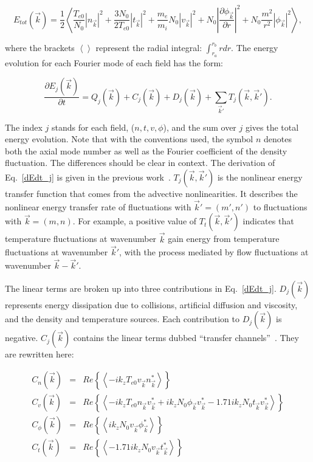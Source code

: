 \documentclass[showpacs,preprintnumbers,amsmath,amssymb,superscriptaddress,aip]{revtex4-1}
\def\beq{\begin{equation}}
\def\eeq{\end{equation}}
\def\beqar{\begin{eqnarray}}
\def\eeqar{\end{eqnarray}}
\newcommand{\pdiff}[2]{\frac{\partial#1}{\partial#2}}
\begin{document}
\beq
\label{E_k}
E_{tot}(\vec{k}) = \frac{1}{2} \left< \frac{T_{e0}}{N_0} |n_{\vec{k}}|^2 + \frac{3 N_0}{2 T_{e0}} |t_{\vec{k}}|^2 + \frac{m_e}{m_i} N_0 |v_{\vec{k}}|^2 + N_0 \left| \pdiff{\phi_{\vec{k}}}{r} \right|^2 + N_0 \frac{m^2}{r^2} |\phi_{\vec{k}}|^2 \right>,
\eeq

where the brackets $\left< \right>$ represent the radial integral: $\int_{r_a}^{r_b} r dr$. 
The energy evolution for each Fourier mode of each field has the form:

\beq
\label{dEdt_j}
\pdiff{E_{j}(\vec{k})}{t} = Q_{j}(\vec{k}) + C_{j}(\vec{k}) + D_j(\vec{k}) + \sum_{\vec{k}'} T_{j}(\vec{k},\vec{k}').
\eeq

The index $j$ stands for each field, ($n,t,v,\phi$), and the sum over $j$ gives the total energy evolution. 
Note that with the conventions used, the symbol $n$ denotes both the axial mode number as
well as the Fourier coefficient of the density fluctuation. The differences should be clear in context. The derivation of Eq.~\ref{dEdt_j} 
is given in the previous work~\cite{friedman2012b}. $T_{j}(\vec{k},\vec{k}')$ is the nonlinear energy transfer function that comes from the advective
nonlinearities.  It describes the nonlinear energy transfer rate of fluctuations with $\vec{k}'=(m',n')$ to fluctuations with $\vec{k}=(m,n)$. 
For example, a positive value of $T_{t}(\vec{k},\vec{k}')$ indicates that temperature fluctuations
at wavenumber $\vec{k}$ gain energy from temperature fluctuations at wavenumber $\vec{k}'$, with the process mediated by flow fluctuations at wavenumber $\vec{k}-\vec{k}'$.

The linear terms are broken up into three contributions in Eq.~\ref{dEdt_j}.
$D_{j}(\vec{k})$ represents energy dissipation due to collisions, artificial diffusion and viscosity, and the density and temperature sources.
Each contribution to $D_j(\vec{k})$ is negative. 
$C_j(\vec{k})$ contains the linear terms dubbed ``transfer channels''~\cite{scott2002}. They are rewritten here:

\beqar
C_n(\vec{k}) & = & Re \left\{ \left< - i k_z T_{e0} v_{\vec{k}} n_{\vec{k}}^* \right> \right\}
\label{Cnk} \\
C_v(\vec{k}) & = & Re \left\{ \left< - i k_z T_{e0} n_{\vec{k}} v_{\vec{k}}^* + i k_z N_0 \phi_{\vec{k}} v_{\vec{k}}^*  - 1.71 i k_z N_0 t_{\vec{k}} v_{\vec{k}}^*  \right> \right\}
\label{Cvk} \\
C_\phi(\vec{k}) & = & Re \left\{ \left< i k_z N_0 v_{\vec{k}} \phi_{\vec{k}}^* \right> \right\}
\label{Cpk} \\
C_t(\vec{k}) & = & Re \left\{ \left< - 1.71 i k_z N_0 v_{\vec{k}} t_{\vec{k}}^* \right> \right\}
\label{Ctk}
\eeqar
\end{document}
